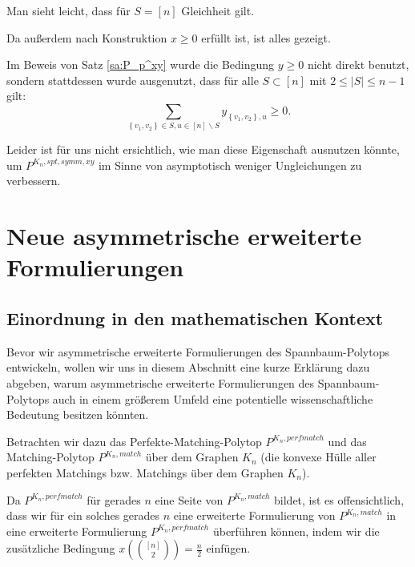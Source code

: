 \documentclass[10p,a4paper,BCOR = 12mm, DIV=15]{scrbook}
\begin{document}
{\begin{bew}
Man sieht leicht, dass für $S=\left[n\right]$ Gleichheit gilt.

Da außerdem nach Konstruktion $x\geq 0$ erfüllt ist, ist alles gezeigt.
\end{bew}

\begin{Bem}
\label{bem:Pxy_noetige_yungleichungen}
Im Beweis von Satz \ref{sa:P_p^xy} wurde die Bedingung $y\geq 0$ nicht direkt benutzt, sondern stattdessen wurde ausgenutzt, dass für alle $S\subset \left[n\right]$ mit $2 \leq \left|S\right| \leq n-1$ gilt:
\begin{displaymath}
\sum_{\left\{v_1, v_2\right\} \in S, u\in \left[n\right] \backslash S} y_{\left\{v_1, v_2\right\}, u} \geq 0.
\end{displaymath}

Leider ist für uns nicht ersichtlich, wie man diese Eigenschaft ausnutzen könnte, um \linebreak $P^{K_n, spt, symm, xy}$ im Sinne von asymptotisch weniger Ungleichungen zu verbessern.
\end{Bem}


\chapter{Neue asymmetrische erweiterte Formulierungen}

\section{Einordnung in den mathematischen Kontext}

Bevor wir asymmetrische erweiterte Formulierungen des Spannbaum-Polytops entwickeln, wollen wir uns in diesem Abschnitt eine kurze Erklärung dazu abgeben, warum asymmetrische erweiterte Formulierungen des Spannbaum-Polytops auch in einem größerem Umfeld eine potentielle wissenschaftliche Bedeutung besitzen könnten.

Betrachten wir dazu das Perfekte-Matching-Polytop $P^{K_n, perfmatch}$ und das Mat\-ching-Polytop $P^{K_n, match}$ über dem Graphen $K_n$ (die konvexe Hülle aller perfekten Matchings bzw. Matchings über dem Graphen $K_n$).

Da $P^{K_n, perfmatch}$ für gerades $n$ eine Seite von $P^{K_n, match}$ bildet, ist es offensichtlich, dass wir für ein solches gerades $n$  eine erweiterte Formulierung von $P^{K_n, match}$ in eine erweiterte Formulierung $P^{K_n, perfmatch}$ überführen können, indem wir die zusätzliche Bedingung $x\left({\left[n\right] \choose 2}\right) = \frac{n}{2}$ einfügen.

}
\end{document}
